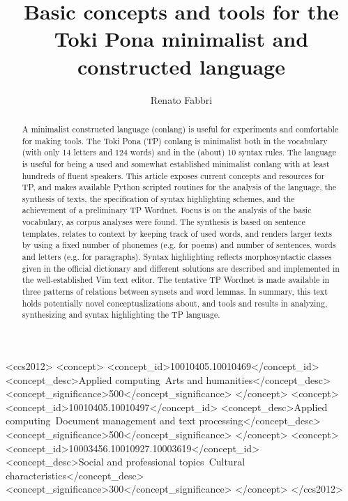 \documentclass[acmlarge]{acmart}
\begin{document}
\title{Basic concepts and tools for the Toki Pona minimalist and
constructed language}

\author{Renato Fabbri}



\begin{abstract}
A minimalist constructed language (conlang)
is useful for experiments and comfortable for making tools.
The Toki Pona (TP) conlang is minimalist both in the vocabulary
(with only 14 letters and 124 words)
and in the (about) 10 syntax rules.
The language is useful for being a used and somewhat established
minimalist conlang with at least hundreds of fluent speakers.
This article exposes current concepts and resources
for TP,
and makes available Python scripted routines for
the analysis of the language,
the synthesis of texts, the specification of syntax highlighting
schemes, and the achievement of a preliminary TP
Wordnet.
Focus is on the analysis of the basic vocabulary,
as corpus analyses were found.
The synthesis is based on sentence templates,
relates to context by keeping track of used words,
and renders larger texts by using a fixed number of phonemes (e.g. for poems)
and number of sentences, words and letters (e.g. for paragraphs).
Syntax highlighting 
reflects morphosyntactic classes given in the official dictionary
and different solutions are described and implemented
in the well-established Vim text editor.
The tentative TP Wordnet is made available in three patterns
  of relations between synsets and word lemmas.
In summary, this text holds potentially novel conceptualizations about,
and tools and results in analyzing, synthesizing and syntax highlighting the
TP language.
\end{abstract}


%
%
\begin{CCSXML}
<ccs2012>
 <concept>
  <concept_id>10010405.10010469</concept_id>
  <concept_desc>Applied computing~Arts and humanities</concept_desc>
  <concept_significance>500</concept_significance>
 </concept>
 <concept>
  <concept_id>10010405.10010497</concept_id>
  <concept_desc>Applied computing~Document management and text processing</concept_desc>
  <concept_significance>500</concept_significance>
 </concept>
 <concept>
  <concept_id>10003456.10010927.10003619</concept_id>
  <concept_desc>Social and professional topics~Cultural characteristics</concept_desc>
  <concept_significance>300</concept_significance>
 </concept>
</ccs2012>
\end{CCSXML}
\end{document}
